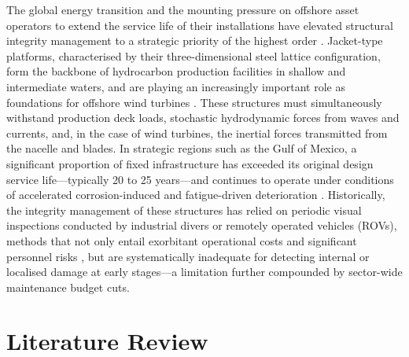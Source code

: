 \documentclass[preprint,12pt]{elsarticle}
\begin{document}
The global energy transition and the mounting pressure on offshore asset operators to extend the service life of their installations have elevated structural integrity management to a strategic priority of the highest order \citep{hlaing2024lifecycle}. Jacket-type platforms, characterised by their three-dimensional steel lattice configuration, form the backbone of hydrocarbon production facilities in shallow and intermediate waters, and are playing an increasingly important role as foundations for offshore wind turbines \citep{mdpi2024shm_wind}. These structures must simultaneously withstand production deck loads, stochastic hydrodynamic forces from waves and currents, and, in the case of wind turbines, the inertial forces transmitted from the nacelle and blades. In strategic regions such as the Gulf of Mexico, a significant proportion of fixed infrastructure has exceeded its original design service life---typically 20 to 25 years---and continues to operate under conditions of accelerated corrosion-induced and fatigue-driven deterioration \citep{mubarak2020condition}. Historically, the integrity management of these structures has relied on periodic visual inspections conducted by industrial divers or remotely operated vehicles (ROVs), methods that not only entail exorbitant operational costs and significant personnel risks \citep{instituto2020tech}, but are systematically inadequate for detecting internal or localised damage at early stages---a limitation further compounded by sector-wide maintenance budget cuts.

\section{Literature Review}
\end{document}
